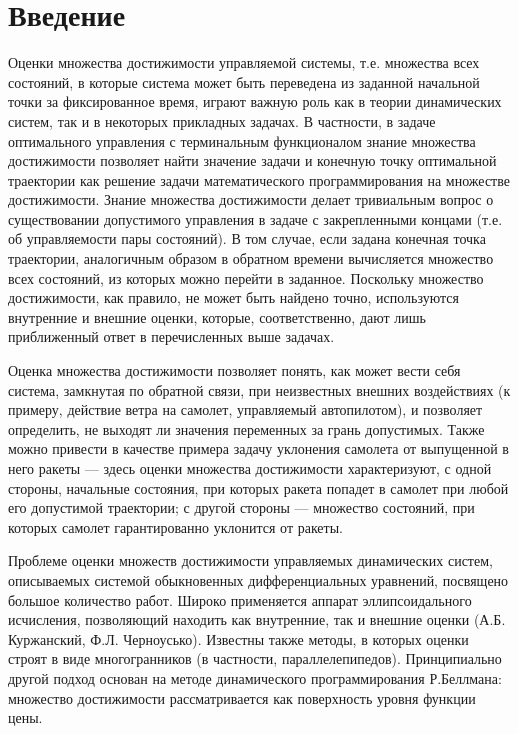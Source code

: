 \section*{Введение}
\label{intro}

Оценки множества достижимости управляемой системы, т.е. множества всех
состояний, в которые система может быть переведена из заданной
начальной точки за фиксированное время, играют важную роль как в
теории динамических систем, так и в некоторых прикладных задачах.  В
частности, в задаче оптимального управления с терминальным
функционалом знание множества достижимости позволяет найти значение
задачи и конечную точку оптимальной траектории как решение задачи
математического программирования на множестве достижимости. Знание
множества достижимости делает тривиальным вопрос о существовании
допустимого управления в задаче с закрепленными концами (т.е. об
управляемости пары состояний).  В том случае, если задана конечная
точка траектории, аналогичным образом в обратном времени вычисляется
множество всех состояний, из которых можно перейти в заданное.
Поскольку множество достижимости, как правило, не может быть найдено
точно, используются внутренние и внешние оценки, которые,
соответственно, дают лишь приближенный ответ в перечисленных выше
задачах.

Оценка множества достижимости позволяет понять, как может вести себя
система, замкнутая по обратной связи, при неизвестных внешних
воздействиях (к примеру, действие ветра на самолет, управляемый
автопилотом), и позволяет определить, не выходят ли значения
переменных за грань допустимых.  Также можно привести в качестве
примера задачу уклонения самолета от выпущенной в него ракеты ---
здесь оценки множества достижимости характеризуют, с одной стороны,
начальные состояния, при которых ракета попадет в самолет при любой
его допустимой траектории; с другой стороны --- множество состояний,
при которых самолет гарантированно уклонится от ракеты.

Проблеме оценки множеств достижимости управляемых динамических систем,
описываемых системой обыкновенных дифференциальных уравнений,
посвящено большое количество работ.  Широко применяется аппарат
эллипсоидального исчисления, позволяющий находить как внутренние, так
и внешние оценки (А.Б. Куржанский, Ф.Л. Черноусько).  Известны также
методы, в которых оценки строят в виде многогранников (в частности,
параллелепипедов).  Принципиально другой подход основан на методе
динамического программирования Р.Беллмана: множество достижимости
рассматривается как поверхность уровня функции цены.

